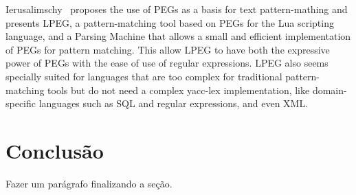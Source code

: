 Ierusalimschy~\cite{ierusalimschy2009-lpeg} proposes the use of PEGs as a basis
for text pattern-mathing and presents LPEG, a pattern-matching tool based on 
PEGs for the Lua scripting language, and a Parsing Machine that allows a small 
and efficient implementation of PEGs for pattern matching. 
This allow LPEG to have both the expressive power of PEGs with the ease of use 
of regular expressions.
LPEG also seems specially suited for languages that are too complex for 
traditional pattern-matching tools but do not need a complex yacc-lex 
implementation, like domain-specific languages such as SQL and regular
expressions, and even XML.

\section{Conclusão}

Fazer um parágrafo finalizando a seção.

\cleardoublepage